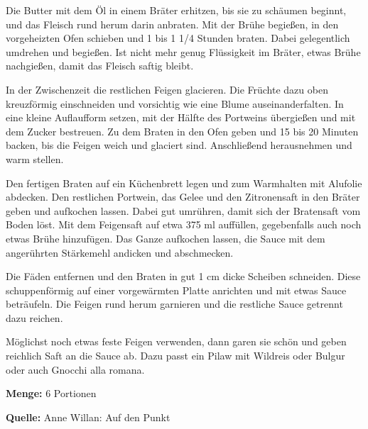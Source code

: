 {Die Butter mit dem Öl in einem Bräter erhitzen, bis sie zu schäumen beginnt, und das Fleisch rund herum darin anbraten. Mit der Brühe begießen, in den vorgeheizten Ofen schieben und 1 bis 1 1/4 Stunden braten. Dabei gelegentlich umdrehen und begießen. Ist nicht mehr genug Flüssigkeit im Bräter, etwas Brühe nachgießen, damit das Fleisch saftig bleibt.

In der Zwischenzeit die restlichen Feigen glacieren. Die Früchte dazu oben kreuzförmig einschneiden und vorsichtig wie eine Blume auseinanderfalten. In eine kleine Auflaufform setzen, mit der Hälfte des Portweins übergießen und mit dem Zucker bestreuen. Zu dem Braten in den Ofen geben und 15 bis 20 Minuten backen, bis die Feigen weich und glaciert sind. Anschließend herausnehmen und warm stellen.

Den fertigen Braten auf ein Küchenbrett legen und zum Warmhalten mit Alufolie abdecken. Den restlichen Portwein, das Gelee und den Zitronensaft in den Bräter geben und aufkochen lassen. Dabei gut umrühren, damit sich der Bratensaft vom Boden löst. Mit dem Feigensaft auf etwa 375 ml auffüllen, gegebenfalls auch noch etwas Brühe hinzufügen. Das Ganze aufkochen lassen, die Sauce mit dem angerührten Stärkemehl andicken und abschmecken.

Die Fäden entfernen und den Braten in gut 1 cm dicke Scheiben schneiden. Diese schuppenförmig auf einer vorgewärmten Platte anrichten und mit etwas Sauce beträufeln. Die Feigen rund herum garnieren und die restliche Sauce getrennt dazu reichen.

Möglichst noch etwas feste Feigen verwenden, dann garen sie schön und geben reichlich Saft an die Sauce ab. Dazu passt ein Pilaw mit Wildreis oder Bulgur oder auch Gnocchi alla romana.


{\bfseries Menge:} 6 Portionen

{\bfseries Quelle:} Anne Willan: Auf den Punkt 

} 

